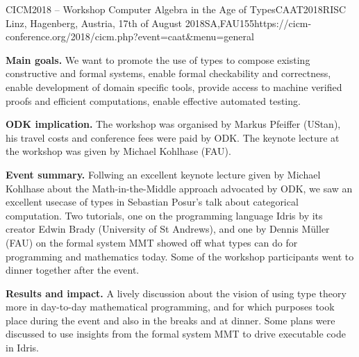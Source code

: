 \begin{event}{CICM2018 -- Workshop Computer Algebra in the Age of Types}{CAAT2018}{RISC Linz, Hagenberg, Austria, 17th of August 2018}{SA,FAU}{15}{5}{https://cicm-conference.org/2018/cicm.php?event=caat&menu=general}

\textbf{Main goals.} We want to promote the use of types to compose existing
constructive and formal systems, enable formal checkability and correctness,
enable development of domain specific tools, provide access to machine verified
proofs and efficient computations, enable effective automated testing.

\textbf{ODK implication.} The workshop was organised by Markus Pfeiffer (UStan), his
travel costs and conference fees were paid by ODK. The keynote lecture at the
workshop was given by Michael Kohlhase (FAU).

\textbf{Event summary.} Follwing an excellent keynote lecture given by Michael
Kohlhase about the Math-in-the-Middle approach advocated by ODK, we saw an
excellent usecase of types in Sebastian Posur's talk about categorical
computation. Two tutorials, one on the programming language Idris by its creator
Edwin Brady (University of St Andrews), and one by Dennis Müller (FAU) on the
formal system MMT showed off what types can do for programming and mathematics
today.
Some of the workshop participants went to dinner together after the event.

\textbf{Results and impact.} A lively discussion about the vision of using type
theory more in day-to-day mathematical programming, and for which purposes took
place during the event and also in the breaks and at dinner.
Some plans were discussed to use insights from the formal system MMT to drive
executable code in Idris.

\end{event}
